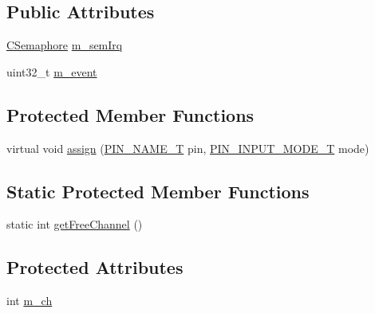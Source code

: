 \subsection*{Public Attributes}
\begin{DoxyCompactItemize}
\item 
\hyperlink{class_c_semaphore}{C\-Semaphore} \hyperlink{class_c_pin_i_n_t_a183f478d30ac65d5a3e85c7939db044e}{m\-\_\-sem\-Irq}
\item 
uint32\-\_\-t \hyperlink{class_c_pin_i_n_t_a53b3ac0896504d345f4b6093cb22f3f3}{m\-\_\-event}
\end{DoxyCompactItemize}
\subsection*{Protected Member Functions}
\begin{DoxyCompactItemize}
\item 
virtual void \hyperlink{class_c_pin_i_n_t_a762631f4e29ba2f09257af8892f8777e}{assign} (\hyperlink{group___peripheral_ga65a2241721e4acb573e0c3fe29ac432f}{P\-I\-N\-\_\-\-N\-A\-M\-E\-\_\-\-T} pin, \hyperlink{group___peripheral_gad5705547b72a4480dc714447b3bbfb64}{P\-I\-N\-\_\-\-I\-N\-P\-U\-T\-\_\-\-M\-O\-D\-E\-\_\-\-T} mode)
\end{DoxyCompactItemize}
\subsection*{Static Protected Member Functions}
\begin{DoxyCompactItemize}
\item 
static int \hyperlink{class_c_pin_i_n_t_ac638835b5fd1ca3f7c29af36677e2b0a}{get\-Free\-Channel} ()
\end{DoxyCompactItemize}
\subsection*{Protected Attributes}
\begin{DoxyCompactItemize}
\item 
int \hyperlink{class_c_pin_i_n_t_a563b913b2126f003c0e1e2f3400a2ed2}{m\-\_\-ch}
\end{DoxyCompactItemize}


